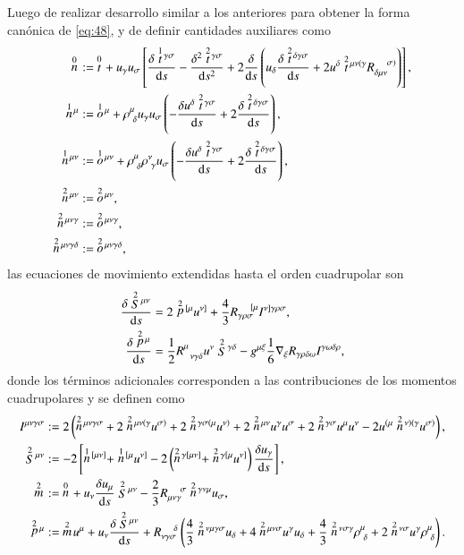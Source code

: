 Luego de realizar desarrollo similar a los anteriores para obtener la forma canónica de \eqref{eq:48}, y de definir cantidades auxiliares como
\begin{align}
\des{0}{n} &:= \ \des{0}{t} + u_{\gamma} u_{\sigma} \left[ \cd{\des{1}{t}^{\gamma \sigma}} - \frac{\delta^2 \des{2}{t}^{\gamma \sigma}}{\mathrm{d}s^2} +2 \cd{} \left( u_{\delta} \cd{\des{2}{t}^{\delta \gamma \sigma}} + 2 u^{\delta} \des{2}{t}^{\mu \nu (\gamma} R_{\delta \mu \nu}^{\ \ \ \ \sigma)} \right) \right],\\
\des{1}{n}^{\mu} &:= \ \des{1}{o}^{\mu} + \rho^{\mu}_{\ \delta} u_{\gamma} u_{\sigma} \left( -\cd{u^{\delta} \des{2}{t}^{\gamma \sigma}} + 2\cd{\des{2}{t}^{\delta \gamma \sigma}} \right),\\
\des{1}{n}^{\mu \nu} &:= \ \des{1}{o}^{\mu \nu} + \rho^{\mu}_{\ \delta} \rho^{\nu}_{\ \gamma} u_{\sigma} \left( -\cd{u^{\delta} \des{2}{t}^{\gamma \sigma}} + 2\cd{\des{2}{t}^{\delta \gamma \sigma}} \right),\\
\des{2}{n}^{\mu \nu} &:= \ \des{2}{o}^{\mu \nu},\\
\des{2}{n}^{\mu \nu \gamma} &:= \ \des{2}{o}^{\mu \nu \gamma},\\
\des{2}{n}^{\mu \nu \gamma \delta} &:= \ \des{2}{o}^{\mu \nu \gamma \delta},
\end{align}
las ecuaciones de movimiento extendidas hasta el orden cuadrupolar son \cite{Steinhoff-Puetzfeld}
\begin{align}
\frac{\delta \stackrel{2}{S}{\!}^{\mu \nu}}{\mathrm{d}s} &= 2\stackrel{2}{p}{\!}^{[\mu} u^{\nu]} + \frac{4}{3} R_{\gamma \rho \sigma}^{\ \ \ \ [\mu} I^{\nu] \gamma \rho \sigma},\\
\label{eq:49}
\frac{\delta \stackrel{2}{p}{\!}^{\mu}}{\mathrm{d}s} &= \frac{1}{2} R^{\mu}_{\ \ \nu \gamma \delta} u^{\nu} \stackrel{2}{S}{\!}^{\gamma \delta} - g^{\mu \xi} \frac{1}{6} \nabla_{\xi} R_{\gamma \rho \delta \omega} I^{\gamma \omega \delta \rho},
\end{align}
donde los términos adicionales corresponden a las contribuciones de los momentos cuadrupolares y se definen como
\begin{align}
I^{\mu \nu \gamma \sigma} &:= 2\left( \des{2}{n}^{\mu \nu \gamma \sigma} + 2 \des{2}{n}^{\mu \nu (\gamma} u^{\sigma)} + 2\des{2}{n}^{\gamma \sigma (\mu} u^{\nu)} + 2\des{2}{n}^{\mu \nu} u^{\gamma} u^{\sigma} + 2\des{2}{n}^{\gamma \sigma} u^{\mu} u^{\nu} - 2 u^{(\mu} \des{2}{n}^{\nu)(\gamma} u^{\sigma)} \right),\\
\des{2}{S}^{\mu \nu} &:= -2 \left[ \des{1}{n}^{[\mu \nu]} + \des{1}{n}^{[\mu} u^{\nu]} - 2\left( \des{2}{n}^{\gamma [\mu \nu]} + \des{2}{n}^{\gamma [\mu} u^{\nu]} \right) \cd{u_{\gamma}} \right],\\
\des{2}{m} &:= \ \des{0}{n} + u_{\nu} \cd{u_{\mu}} \des{2}{S}^{\mu \nu} - \frac{2}{3} R_{\mu \nu \gamma}^{\ \ \ \ \sigma} \des{2}{n}^{\gamma \nu \mu} u_{\sigma},\\
\des{2}{p}^{\mu} &:= \ \des{2}{m} u^{\mu} + u_{\nu} \cd{\des{2}{S}^{\mu \nu}} + R_{\nu \gamma \sigma}^{\ \ \ \ \delta} \left( \frac{4}{3}\des{2}{n}^{\nu \mu \gamma \sigma} u_{\delta} + 4\des{2}{n}^{\mu \nu \sigma} u^{\gamma} u_{\delta} + \frac{4}{3} \des{2}{n}^{\nu \sigma \gamma} \rho^{\mu}_{\ \delta} + 2 \des{2}{n}^{\nu \sigma} u^{\gamma} \rho^{\mu}_{\ \delta} \right).
\end{align}


